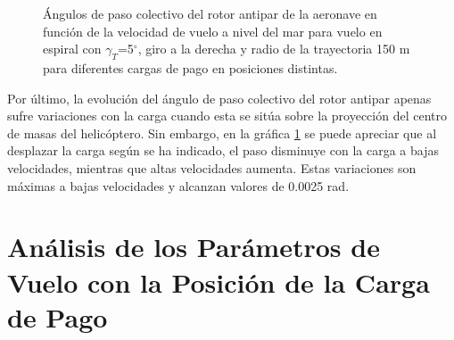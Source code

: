\begin{figure}
	\centering
	\caption{Ángulos de paso colectivo del rotor antipar de la aeronave en función de la velocidad de vuelo a nivel del mar para vuelo en espiral con $\gamma_T$=5$^\circ$, giro a la derecha y radio de la trayectoria 150 m para diferentes cargas de pago en posiciones distintas.}
	\label{Theta0VEraMPL}
\end{figure}

Por último, la evolución del ángulo de paso colectivo del rotor antipar apenas sufre variaciones con la carga cuando esta se sitúa sobre la proyección del centro de masas del helicóptero. Sin embargo, en la gráfica \ref{Theta0VEraMPL} se puede apreciar que al desplazar la carga según se ha indicado, el paso disminuye con la carga a bajas velocidades, mientras que altas velocidades aumenta. Estas variaciones son máximas a bajas velocidades y alcanzan valores de 0.0025 rad.

\section{Análisis de los Parámetros de Vuelo con la Posición de la Carga de Pago}

